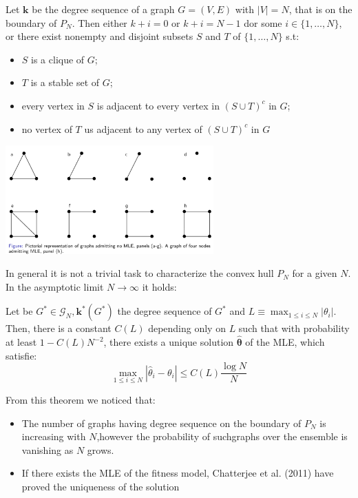 \newpage
\begin{mytheorem}
Let $\mathbf{k}$ be the degree sequence of a graph $G = (V,E)$ with $|V| =N$, that is on the boundary of $P_N$. Then either $k+i = 0$ or $k+i = N-1$ dor some $i \in \{1,\ldots,N\}$, or there exist nonempty and disjoint subsets $S$ and $T$ of $\{1,\ldots,N\}$ s.t:
\begin{itemize}
	\item $S$ is a clique of $G$;
	\item $T$ is a stable set of $G$;
	\item every vertex in $S$ is adjacent to every vertex in $(S \cup T)^c$ in $G$;
	\item no vertex of $T$ us adjacent to any vertex of $(S\cup T)^c$ in $G$
\end{itemize}
\end{mytheorem}
\begin{center}
	\includegraphics[width=0.6\textwidth]{picture/(46)MLE_admitting.png}
\end{center}
In general it is not a trivial task to characterize the convex hull $P_N$ for a given $N$. In the asymptotic limit $N\to \infty$ it holds:
\begin{mytheorem}
	Let be $G^* \in \mathcal{G}_N, \mathbf{k}^\ast(G^\ast)$ the degree sequence of $G^\ast$ and $L \equiv \max_{1\leq i \leq N} |\theta_i|$. Then, there is a constant $C(L)$ depending only on $L$ such that with probability at least $1- C(L)N^{-2}$, there exists a unique solution $\mathbf{\hat{\theta}}$ of the MLE, which satisfie:
	\[
	\max_{1\leq i \leq N} |\hat{\theta}_i - \theta_i| \leq C(L) \frac{\log N}{N}
	\]
\end{mytheorem}
From this theorem we noticed that:
\begin{itemize}
	\item The number of graphs having degree sequence on the boundary of $P_N$ is increasing with $N$,however the probability of suchgraphs over the ensemble is vanishing as $N$ grows.
	\item If there exists the MLE of the fitness model, Chatterjee et al. (2011) have proved the uniqueness of the solution
\end{itemize}

